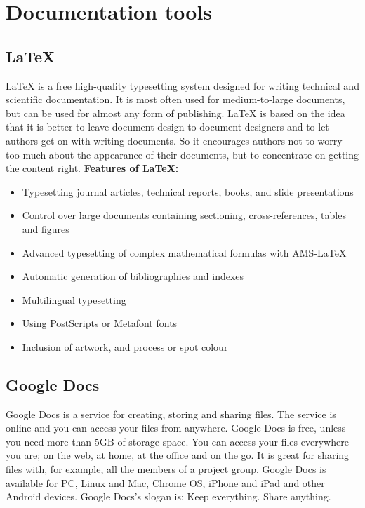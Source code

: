 \section{Documentation tools}

\subsection{LaTeX}
LaTeX is a free high-quality typesetting system designed for writing technical and scientific documentation. It is most often used for medium-to-large documents, but can be used for almost any form of publishing. 
\newline
\newline
LaTeX is based on the idea that it is better to leave document design to document designers and to let authors get on with writing documents. So it encourages authors not to worry too much about the appearance of their documents, but to concentrate on getting the content right.
\newline
\newline
\textbf{Features of LaTeX:}
\begin{itemize}
\item{}Typesetting journal articles, technical reports, books, and slide presentations
\item{}Control over large documents containing sectioning, cross-references, tables and figures
\item{}Advanced typesetting of complex mathematical formulas with AMS-LaTeX
\item{}Automatic generation of bibliographies and indexes
\item{}Multilingual typesetting
\item{}Using PostScripts or Metafont fonts
\item{}Inclusion of artwork, and process or spot colour
\end{itemize}

\subsection{Google Docs}
Google Docs is a service for creating, storing and sharing files. The service is online and you can access your files from anywhere. Google Docs is free, unless you need more than 5GB of storage space. You can access your files everywhere you are; on the web, at home, at the office and on the go. It is great for sharing files with, for example, all the members of a project group. Google Docs is available for PC, Linux and Mac, Chrome OS, iPhone and iPad and other Android devices.
\newline
\newline
Google Docs’s slogan is:  Keep everything. Share anything.

